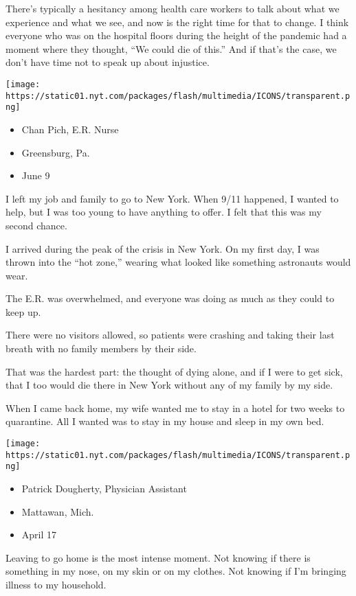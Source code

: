 There's typically a hesitancy among health care workers to talk about
what we experience and what we see, and now is the right time for that
to change. I think everyone who was on the hospital floors during the
height of the pandemic had a moment where they thought, ``We could die
of this.'' And if that's the case, we don't have time not to speak up
about injustice.

\texttt{[image: https://static01.nyt.com/packages/flash/multimedia/ICONS/transparent.png]}

\begin{itemize}
\tightlist
\item
  Chan Pich, E.R. Nurse
\item
  Greensburg, Pa.
\item
  June 9
\end{itemize}

I left my job and family to go to New York. When 9/11 happened, I wanted
to help, but I was too young to have anything to offer. I felt that this
was my second chance.

I arrived during the peak of the crisis in New York. On my first day, I
was thrown into the ``hot zone,'' wearing what looked like something
astronauts would wear.

The E.R. was overwhelmed, and everyone was doing as much as they could
to keep up.

There were no visitors allowed, so patients were crashing and taking
their last breath with no family members by their side.

That was the hardest part: the thought of dying alone, and if I were to
get sick, that I too would die there in New York without any of my
family by my side.

When I came back home, my wife wanted me to stay in a hotel for two
weeks to quarantine. All I wanted was to stay in my house and sleep in
my own bed.

\texttt{[image: https://static01.nyt.com/packages/flash/multimedia/ICONS/transparent.png]}

\begin{itemize}
\tightlist
\item
  Patrick Dougherty, Physician Assistant
\item
  Mattawan, Mich.
\item
  April 17
\end{itemize}

Leaving to go home is the most intense moment. Not knowing if there is
something in my nose, on my skin or on my clothes. Not knowing if I'm
bringing illness to my household.

